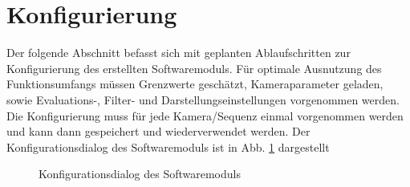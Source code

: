 \section{Konfigurierung}
\label{sec:konfig}
Der folgende Abschnitt befasst sich mit geplanten Ablaufschritten zur Konfigurierung des erstellten Softwaremoduls. Für optimale Ausnutzung des Funktionsumfangs müssen Grenzwerte geschätzt, Kameraparameter geladen, sowie Evaluations-, Filter- und Darstellungseinstellungen vorgenommen werden. Die Konfigurierung muss für jede Kamera/Sequenz einmal vorgenommen werden und kann dann gespeichert und wiederverwendet werden. Der Konfigurationsdialog des Softwaremoduls ist in Abb. \ref{konfig} dargestellt
\vskip 10pt
\begin{figure}[h]
  \centering
  \caption{Konfigurationsdialog des Softwaremoduls}
  \label{konfig}
\end{figure}


